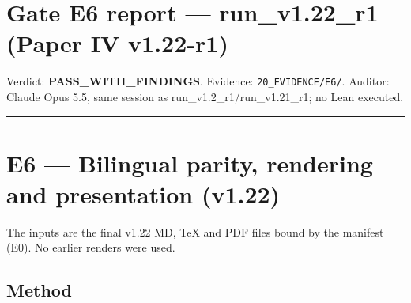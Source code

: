 \documentclass[
]{article}
\author{}
\date{}
\begin{document}
\section{Gate E6 report --- run\_v1.22\_r1 (Paper IV
v1.22-r1)}\label{gate-e6-report--run_v122_r1-paper-iv-v122-r1}

Verdict: \textbf{PASS\_WITH\_FINDINGS}. Evidence:
\texttt{20\_EVIDENCE/E6/}. Auditor: Claude Opus 5.5, same session as
run\_v1.2\_r1/run\_v1.21\_r1; no Lean executed.

\begin{center}\rule{0.5\linewidth}{0.5pt}\end{center}

\section{E6 --- Bilingual parity, rendering and presentation
(v1.22)}\label{e6--bilingual-parity-rendering-and-presentation-v122}

The inputs are the final v1.22 MD, TeX and PDF files bound by the
manifest (E0). No earlier renders were used.

\subsection{Method}\label{method}
\end{document}
